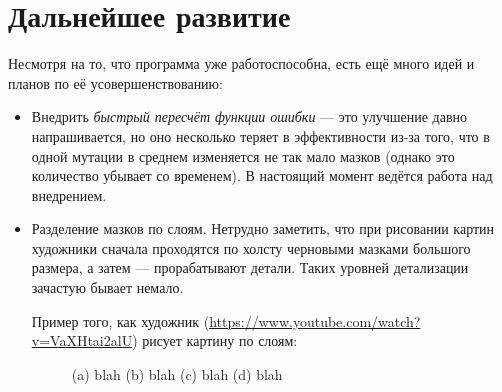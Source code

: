 \documentclass[11pt]{article}
\begin{document}
    \section{Дальнейшее развитие}\label{sec:todo}
    Несмотря на то, что программа уже работоспособна, есть ещё много идей и планов по её усовершенствованию:
    \begin{itemize}
        \item Внедрить \textit{быстрый пересчёт функции ошибки} — это улучшение давно напрашивается,
                но оно несколько теряет в эффективности из-за того, что в одной мутации в среднем изменяется
                не так мало мазков (однако это количество убывает со временем).
                В настоящий момент ведётся работа над внедрением.
        \item Разделение мазков по слоям.
                Нетрудно заметить, что при рисовании картин художники сначала проходятся по холсту черновыми мазками большого размера, а затем — прорабатывают детали.
                Таких уровней детализации зачастую бывает немало.

        Пример того, как художник (\href{https://www.youtube.com/watch?v=VaXHtai2alU}{https://www.youtube.com/watch?v=VaXHtai2alU}) рисует картину по слоям:


        \begin{figure}
            \centering
            \caption{(a) blah (b) blah (c) blah (d) blah}
            \label{fig:layered_painting}
        \end{figure}

%
%
%
%
%


\end{itemize}
\end{document}
